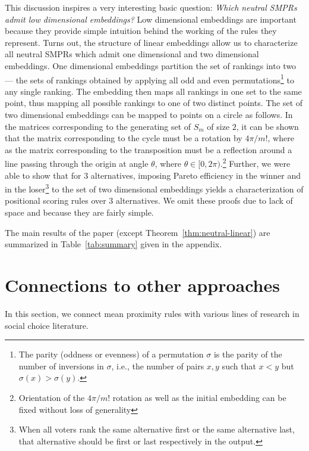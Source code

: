 \documentclass[prodmode,acmec]{ec-acmsmall}
\begin{document}
This discussion inspires a very interesting basic question: \emph{Which neutral SMPRs admit low dimensional embeddings?} Low dimensional embeddings are important because they provide simple intuition behind the working of the rules they represent. Turns out, the structure of linear embeddings allow us to characterize all neutral SMPRs which admit one dimensional and two dimensional embeddings. One dimensional embeddings partition the set of rankings into two --- the sets of rankings obtained by applying all odd and even permutations\footnote{The parity (oddness or evenness) of a permutation $\sigma$ is the parity of the number of inversions in $\sigma$, i.e., the number of pairs $x,y$ such that $x < y$ but $\sigma(x) > \sigma(y)$.} to any single ranking. The embedding then maps all rankings in one set to the same point, thus mapping all possible rankings to one of two distinct points. The set of two dimensional embeddings can be mapped to points on a circle as follows. In the matrices corresponding to the generating set of $S_m$ of size $2$, it can be shown that the matrix corresponding to the cycle must be a rotation by $4 \pi / m!$, where as the matrix corresponding to the transposition must be a reflection around a line passing through the origin at angle $\theta$, where $\theta \in [0,2\pi)$.\footnote{Orientation of the $4\pi/m!$ rotation as well as the initial embedding can be fixed without loss of generality} Further, we were able to show that for $3$ alternatives, imposing Pareto efficiency in the winner and in the loser\footnote{When all voters rank the same alternative first or the same alternative last, that alternative should be first or last respectively in the output.} to the set of two dimensional embeddings yields a characterization of positional scoring rules over $3$ alternatives. We omit these proofs due to lack of space and because they are fairly simple. 

The main results of the paper (except Theorem~\ref{thm:neutral-linear}) are summarized in Table~\ref{tab:summary} given in the appendix.


\section{Connections to other approaches}
\label{sec:connection}
In this section, we connect mean proximity rules with various lines of research in social choice literature. 
\end{document}
